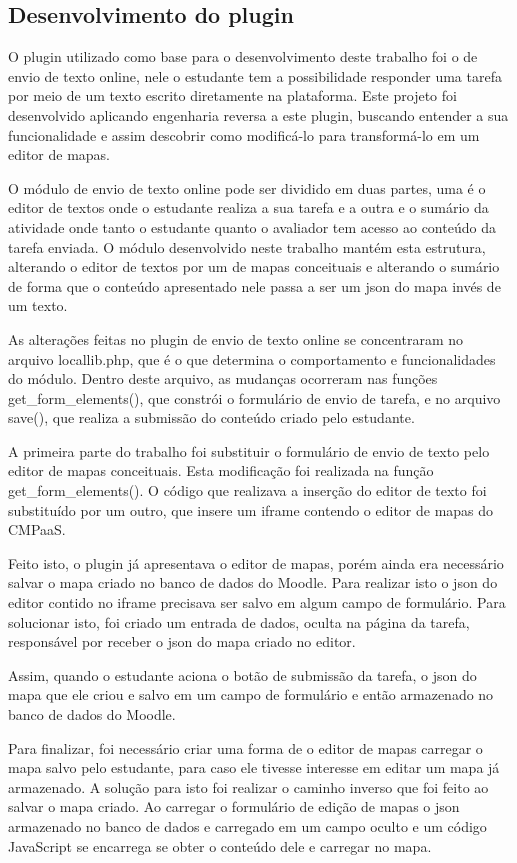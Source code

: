 \documentclass[
	12pt,				%
	openright,			%
	oneside,			%
	a4paper,			%
	english,			%
	french,				%
	spanish,			%
	brazil				%
	]{abntex2}
\begin{document}
\subsection{Desenvolvimento do plugin}
O plugin utilizado como base para o desenvolvimento deste trabalho foi o de envio de texto online, nele o estudante tem a possibilidade responder uma tarefa por meio de um texto escrito diretamente na plataforma. Este projeto foi desenvolvido aplicando engenharia reversa a este plugin, buscando entender a sua funcionalidade e assim descobrir como modificá-lo para transformá-lo em um editor de mapas.

O módulo de envio de texto online pode ser dividido em duas partes, uma é o editor de textos onde o estudante realiza a sua tarefa e a outra e o sumário da atividade onde tanto o estudante quanto o avaliador tem acesso ao conteúdo da tarefa enviada. O módulo desenvolvido neste trabalho mantém esta estrutura, alterando o editor de textos por um de mapas conceituais e alterando o sumário de forma que o conteúdo apresentado nele passa a ser um json do mapa invés de um texto.

As alterações feitas no plugin de envio de texto online se concentraram no arquivo locallib.php, que é o que determina o comportamento e funcionalidades do módulo. Dentro deste arquivo, as mudanças ocorreram nas funções get\_form\_elements(), que constrói o formulário de envio de tarefa, e no arquivo save(), que realiza a submissão do conteúdo criado pelo estudante.

A primeira parte do trabalho foi substituir o formulário de envio de texto pelo editor de mapas conceituais. Esta modificação foi realizada na função get\_form\_elements(). O código que realizava a inserção do editor de texto foi substituído por um outro, que insere um iframe contendo o editor de mapas do CMPaaS. 

Feito isto, o plugin já apresentava o editor de mapas, porém ainda era necessário salvar o mapa criado no banco de dados do Moodle. Para realizar isto o json do editor contido no iframe precisava ser salvo em algum campo de formulário. Para solucionar isto, foi criado um entrada de dados, oculta na página da tarefa, responsável por receber o json do mapa criado no editor.

Assim, quando o estudante aciona o botão de submissão da tarefa, o json do mapa que ele criou e salvo em um campo de formulário e então armazenado no banco de dados do Moodle.

Para finalizar, foi necessário criar uma forma de o editor de mapas carregar o mapa salvo pelo estudante, para caso ele tivesse interesse em editar um mapa já armazenado. A solução para isto foi realizar o caminho inverso que foi feito ao salvar o mapa criado. Ao carregar o formulário de edição de mapas o json armazenado no banco de dados e carregado em um campo oculto e um código JavaScript se encarrega se obter o conteúdo dele e carregar no mapa.
\end{document}
